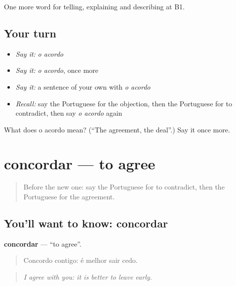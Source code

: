 \begin{grammarlens}[title={What you've built}]
One more word for telling, explaining and describing at B1.
\end{grammarlens}

\subsection*{Your turn}
\begin{itemize}
\raggedright
  \item \emph{Say it:} \emph{o acordo}
  \item \emph{Say it:} \emph{o acordo}, once more
  \item \emph{Say it:} a sentence of your own with \emph{o acordo}
  \item \emph{Recall:} say the Portuguese for the objection, then the Portuguese for to contradict, then say \emph{o acordo} again
\end{itemize}

\begin{tcolorbox}[breakable,colback=teal!4,colframe=teal!35!black,title={Before you move on}]
What does o acordo mean? (\textquotedblleft{}The agreement, the deal\textquotedblright{}.) Say it once more.
\end{tcolorbox}
\section[concordar]{concordar — to agree}

\label{lesson:PT-C339-concordar}



\begin{quote}
Before the new one: say the Portuguese for to contradict, then the Portuguese for the agreement.
\end{quote}

\subsection*{You'll want to know: concordar}
\textbf{concordar} — \textquotedblleft{}to agree\textquotedblright{}.

\begin{quote}
Concordo contigo: é melhor sair cedo.
\end{quote}

\begin{quote}
\emph{I agree with you: it is better to leave early.}
\end{quote}

